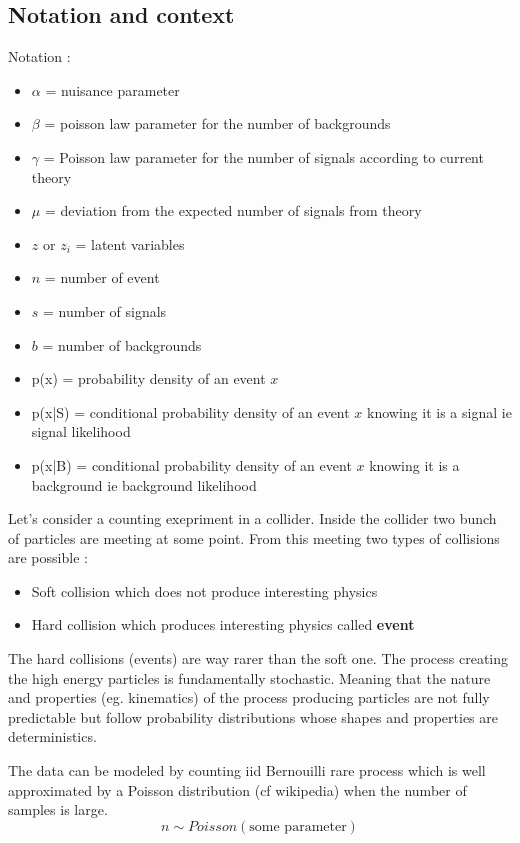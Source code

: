 \subsection{Notation and context} %
\label{sub:notation_and_context}

Notation :
\begin{itemize}
	\item $\alpha$ = nuisance parameter
	\item $\beta$ = poisson law parameter for the number of backgrounds
	\item $\gamma$ = Poisson law parameter for the number of signals according to current theory
	\item $\mu$ = deviation from the expected number of signals from theory
	\item $z$ or $z_i$ = latent variables 
	\item $n$ = number of event
	\item $s$ = number of signals
	\item $b$ = number of backgrounds
	\item p(x) = probability density of an event $x$
	\item p(x|S) = conditional probability density of an event $x$ knowing it is a signal ie signal likelihood
	\item p(x|B) = conditional probability density of an event $x$ knowing it is a background ie background likelihood
\end{itemize}

Let's consider a counting exepriment in a collider.
Inside the collider two bunch of particles are meeting at some point.
From this meeting two types of collisions are possible :
\begin{itemize}
	\item Soft collision which does not produce interesting physics
	\item Hard collision which produces interesting physics called \textbf{event}
\end{itemize}

The hard collisions (events) are way rarer than the soft one.
The process creating the high energy particles is fundamentally stochastic.
Meaning that the nature and properties (eg. kinematics) of the process producing particles are not fully predictable but follow probability distributions whose shapes and properties are deterministics.

The data can be modeled by counting iid Bernouilli rare process which is well approximated by a Poisson distribution \needcite (cf wikipedia) when the number of samples is large.
\begin{equation}
	n \sim Poisson(\text{some parameter})
\end{equation}


